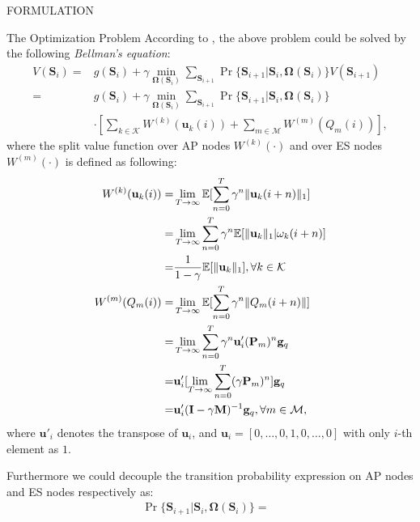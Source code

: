 \documentclass[10pt, conference, letterpaper]{IEEEtran}
\newcommand{\mat}{\mathbf}
\renewcommand{\vec}{\mathbf}
\DeclarePairedDelimiter{\Inorm}{\|}{\|_1}
\newcommand{\apSet}{\mathcal{K}}
\newcommand{\esSet}{\mathcal{M}}
\newcommand{\Stat}{\mathbf{S}}
\newcommand{\Policy}{\mathbf{\Omega}}
\begin{document}
\begin{section}{FORMULATION}
\begin{subsection}{The Optimization Problem}
            According to \cite{sutton1998introduction}, the above problem could be solved by the following \emph{Bellman's equation}:
            \begin{align}
                V(\Stat_{i}) =& g(\Stat_i) + \gamma \min_{\Policy(\Stat_{i})} \sum_{\Stat_{i+1}} \Pr\{ \Stat_{i+1}|\Stat_{i}, \Policy(\Stat_{i}) \} V(\Stat_{i+1})
                \nonumber\\
                =& g(\Stat_{i}) + \gamma \min_{\Policy(\Stat_{i})} \sum_{\Stat_{i+1}} \Pr\{ \Stat_{i+1}|\Stat_{i}, \Policy(\Stat_{i}) \}
                    \nonumber\\
                    & \cdot [\sum_{k\in\apSet} W^{(k)}(\vec{u}_k(i)) + \sum_{m\in\esSet} W^{(m)}(Q_m(i))],
            \end{align}
            where the split value function over AP nodes $W^{(k)}(\cdot)$ and over ES nodes $W^{(m)}(\cdot)$ is defined as following:
            \begin{align}
                W^{(k)}(\vec{u}_k(i)) =& \lim_{T\to\infty} \mathbb{E}[\sum_{n=0}^{T} \gamma^{n} \Inorm{\vec{u}_k(i+n)}]
                \nonumber\\
                =& \lim_{T\to\infty} \sum_{n=0}^{T} \gamma^{n} \mathbb{E}[\Inorm{\vec{u}_k}|\omega_k(i+n)]
                \nonumber\\
                =& \frac{1}{1-\gamma} \mathbb{E}[\Inorm{\vec{u}_k}], \forall k\in\apSet
                \\
                W^{(m)}(Q_m(i)) =& \lim_{T\to\infty} \mathbb{E}[\sum_{n=0}^{T} \gamma^{n} \|Q_m(i+n)\|]
                \nonumber\\
                =& \lim_{T\to\infty} \sum_{n=0}^{T} \gamma^{n} \vec{u}'_i (\mat{P}_m)^{n} \vec{g}_q
                \nonumber\\
                =& \vec{u}'_i [\lim_{T\to\infty} \sum_{n=0}^{T} (\gamma \mat{P}_m)^{n}] \vec{g}_q
                \nonumber\\
                =& \vec{u}'_i (\mat{I} - \gamma \mat{M})^{-1} \vec{g}_q, \forall m\in\esSet,
            \end{align}
            where $\vec{u}'_i$ denotes the transpose of $\vec{u}_i$, and $\vec{u}_i = [0,\dots,0,1,0,\dots,0]$ with only $i$-th element as $1$.

            Furthermore we could decouple the transition probability expression on AP nodes and ES nodes respectively as:
            \begin{align}
                \Pr\{\Stat_{i+1}|\Stat_{i}, \Policy(\Stat_{i})\} =& 
            \end{align}
        \end{subsection}
    \end{section}
\end{document}
